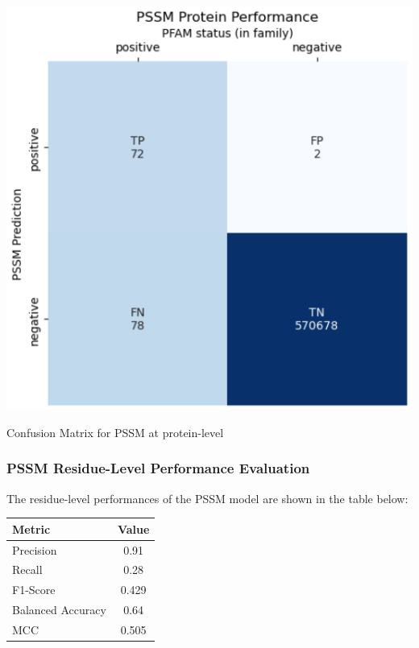 \documentclass[10pt,twocolumn,letterpaper]{article}
\begin{document}
\begin{center}
    \includegraphics[scale=0.45]{report/img/pssm_prot_performance.png}
\end{center}

\begin{center}
    \small{Confusion Matrix for PSSM at protein-level}
\end{center}

\subsubsection{PSSM Residue-Level Performance Evaluation}

The residue-level performances of the PSSM model are shown in the table below:


\begin{center}
    \begin{tabular}{lc}
        \toprule
        Metric & Value \\
        \midrule
        Precision & 0.91 \\
        Recall & 0.28 \\
        F1-Score & 0.429 \\
        Balanced Accuracy & 0.64 \\
        MCC & 0.505 \\
        \bottomrule
    \end{tabular}
\end{center} \\
\end{document}

